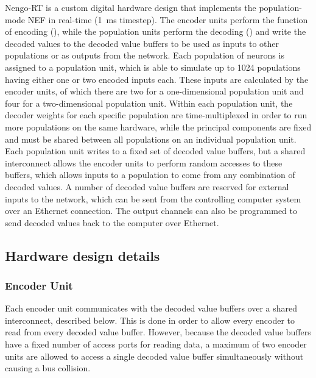 \documentclass[english]{article}
\newcommand{\design}{Nengo-RT}
\begin{document}
\design{} is a custom digital hardware design that implements the population-mode NEF in real-time (1~ms timestep).
The encoder units perform the function of encoding (), %
while the population units perform the decoding () %
and write the decoded values to the decoded value buffers
to be used as inputs to other populations or as outputs from the network.
Each population of neurons is assigned to a population unit, which is able to simulate up to 1024 populations
having either one or two encoded inputs each. These inputs are calculated by the encoder units,
of which there are two for a one-dimensional population unit and four for a two-dimensional population unit.
Within each population unit, the decoder weights for each specific population are time-multiplexed
in order to run more populations on the same hardware, while the principal components are fixed and must be shared
between all populations on an individual population unit.
Each population unit writes to a fixed set of decoded value buffers, but a shared interconnect
allows the encoder units to perform random accesses to these buffers, which allows
inputs to a population to come from any combination of decoded values.
A number of decoded value buffers are reserved for external inputs to the network,
which can be sent from the controlling computer system over an Ethernet connection.
The output channels can also be programmed to send decoded values back to the computer over Ethernet.

\subsection{Hardware design details}

\subsubsection{Encoder Unit}

Each encoder unit communicates with the decoded value buffers over a shared interconnect, described below.
This is done in order to allow every encoder to read from every decoded value buffer.
However, because the decoded value buffers have a fixed number of access ports for reading data,
a maximum of two encoder units are allowed to access a single decoded value buffer simultaneously
without causing a bus collision.
\end{document}
